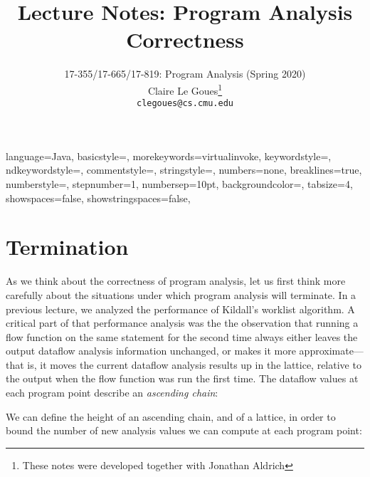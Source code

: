 \documentclass[11pt]{article}
\title{Lecture Notes:
Program Analysis Correctness}
\author{17-355/17-665/17-819: Program Analysis (Spring 2020)\\
        Claire Le Goues\footnote{These notes were developed together with Jonathan Aldrich}\\
		{\tt clegoues@cs.cmu.edu}}
\date{}
\begin{document}
\maketitle
{}

 {
language=Java,
basicstyle=\ttfamily,
  morekeywords={virtualinvoke},
  keywordstyle=\color{blue},
  ndkeywordstyle=\color{red},
  commentstyle=\color{dkred},
  stringstyle=\color{dkgreen},
  numbers=none,
  breaklines=true,
  numberstyle=\ttfamily\footnotesize\color{gray},
  stepnumber=1,
  numbersep=10pt,
  backgroundcolor=\color{white},
  tabsize=4,
  showspaces=false,
  showstringspaces=false,
}
\lstset{style=javastyle}


\section{Termination}

As we think about the correctness of program analysis, let us first think more carefully about the situations under which program analysis will terminate.  In a previous lecture, we analyzed the performance of Kildall's worklist algorithm.  A critical part of that performance analysis was the the observation that running a flow function on the same statement for the second time always either leaves the output dataflow analysis information unchanged, or makes it more approximate---that is, it moves the current dataflow analysis results up in the lattice, relative to the output when the flow function was run the first time.  The dataflow values at each program point describe an \textit{ascending chain}:


\noindent We can define the height of an ascending chain, and of a lattice, in order to bound the number of new analysis values we can compute at each program point:

\end{document}
